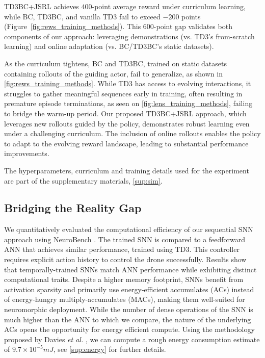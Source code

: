 TD3BC+JSRL achieves $400$-point average reward under curriculum learning, while BC, TD3BC, and vanilla TD3 fail to exceed $-200$ points (Figure~\ref{fig:rews_training_methods}). This $600$-point gap validates both components of our approach: leveraging demonstrations (vs. TD3's from-scratch learning) and online adaptation (vs. BC/TD3BC's static datasets).

As the curriculum tightens, BC and TD3BC, trained on static datasets containing rollouts of the guiding actor, fail to generalize, as shown in \autoref{fig:rews_training_methods}. While TD3 has access to evolving interactions, it struggles to gather meaningful sequences early in training, often resulting in premature episode terminations, as seen on \autoref{fig:lens_training_methods}, failing to bridge the warm-up period. Our proposed TD3BC+JSRL approach, which leverages new rollouts guided by the policy, demonstrates robust learning even under a challenging curriculum. The inclusion of online rollouts enables the policy to adapt to the evolving reward landscape, leading to substantial performance improvements. 

The hyperparameters, curriculum and training details used for the experiment are part of the supplementary materials, \autoref{sup:sim}.

\subsection{Bridging the Reality Gap}
We quantitatively evaluated the computational efficiency of our sequential SNN approach using NeuroBench \cite{yik2023neurobench}. 
The trained SNN is compared to a feedforward ANN that achieves similar performance, trained using TD3. This controller requires explicit action history to control the drone successfully. Results show that temporally-trained SNNs match ANN performance while exhibiting distinct computational traits. Despite a higher memory footprint, SNNs benefit from activation sparsity and primarily use energy-efficient accumulates (ACs) instead of energy-hungry multiply-accumulates (MACs), making them well-suited for neuromorphic deployment. While the number of dense operations of the SNN is much higher than the ANN to which we compare, the nature of the underlying ACs opens the opportunity for energy efficient compute. Using the methodology proposed by Davies \textit{et al.} \cite{Davies2018}, we can compute a rough energy consumption estimate of $9.7\times10^{-5}mJ$, see \autoref{sup:energy} for further details.

